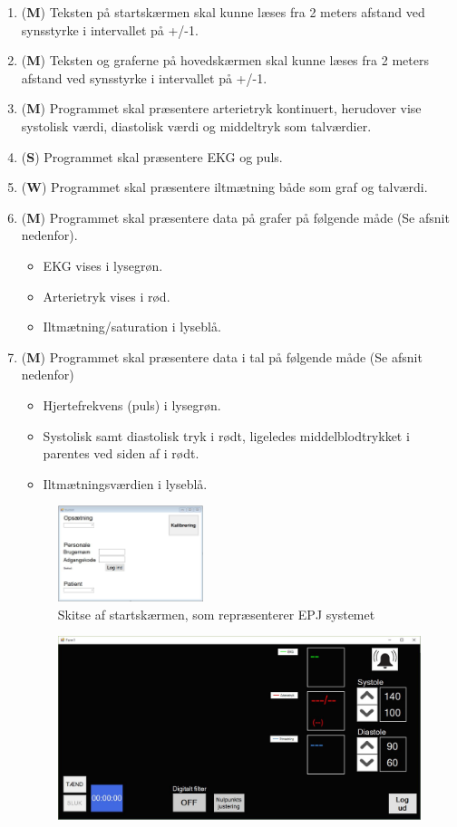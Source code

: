 \begin{enumerate}
\begin{enumerate}
\item (\textbf{M}) Teksten på startskærmen skal kunne læses fra 2 meters afstand ved synsstyrke i intervallet på +/-1.
\item (\textbf{M}) Teksten og graferne på hovedskærmen skal kunne læses fra 2 meters afstand ved synsstyrke i intervallet på +/-1.
\item (\textbf{M}) Programmet skal præsentere arterietryk kontinuert, herudover vise systolisk værdi, diastolisk værdi og middeltryk som talværdier.
\item (\textbf{S}) Programmet skal præsentere EKG og puls.
\item (\textbf{W}) Programmet skal præsentere iltmætning både som graf og talværdi.
\item (\textbf{M}) Programmet skal præsentere data på grafer på følgende måde (Se afsnit nedenfor).
\begin{itemize}
\item EKG vises i lysegrøn.
\item Arterietryk vises i rød.
\item Iltmætning/saturation i lyseblå.
\end{itemize}
\item (\textbf{M}) Programmet skal præsentere data i tal på følgende måde (Se afsnit nedenfor)
\begin{itemize}
\item Hjertefrekvens (puls) i lysegrøn.
\item Systolisk samt diastolisk tryk i rødt, ligeledes middelblodtrykket i parentes ved siden af i rødt.
\item Iltmætningsværdien i lyseblå.
\end{itemize}
\begin{figure}[h!]
\includegraphics[width =0.4\textwidth , center]{billeder/skitseStart}
\caption{Skitse af startskærmen, som repræsenterer EPJ systemet}
\end{figure}
\begin{figure}[h!]
\includegraphics[width =1.0\textwidth , center]{billeder/skitseHoved}

\end{figure}
\end{enumerate}
\end{enumerate}
